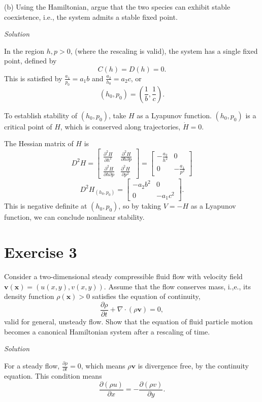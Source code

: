 \documentclass[a4paper,11pt,pdftex]{article}
\begin{document}
(b) Using the Hamiltonian, argue that the two species can exhibit stable coexistence, i.e., the system admits a stable fixed point. 

\emph{Solution}

In the region $h,p>0$, (where the rescaling is valid), the system has a single fixed point, defined by 
$$
C(h) = D(h) = 0. 
$$
This is satisfied by $\frac{a_1}{p_0} = a_1b$ and $\frac{a_2}{h_0} = a_2c$, or 
$$
(h_0, p_0) = \left(\frac{1}{b}, \frac{1}{c} \right).
$$

To establish stability of $(h_0, p_0)$, take $H$ as a Lyapunov function. $(h_0, p_0)$ is a critical point of $H$, which is conserved along trajectories, $\dot{H}=0$. 

The Hessian matrix of $H$ is
$$
D^2H = \begin{bmatrix}\frac{\partial^2 H}{\partial h^2} &  \frac{\partial^2 H}{\partial h\partial p} \\
\frac{\partial^2 H}{\partial h\partial p} & \frac{\partial^2 H}{\partial p^2}\end{bmatrix} = \begin{bmatrix} -\frac{a_2}{h^2} & 0 \\ 0 & -\frac{a_1}{p^2} \end{bmatrix} 
$$
$$
D^2 H_{(h_0,p_0)} = \begin{bmatrix}-a_2b^2 & 0 \\ 0 & -a_1c^2\end{bmatrix}.
$$
This is negative definite at $(h_0, p_0)$, so by taking $V=-H$ as a Lyapunov function, we can conclude nonlinear stability. 


\section*{Exercise 3}
Consider a two-dimensional steady compressible fluid flow with velocity field $\mathbf{v}(\mathbf{x})=(u(x,y), v(x,y))$. Assume that the flow conserves mass, i.,e., its density function $\rho(\mathbf{x})>0$ satisfies the equation of continuity,
$$
\frac{\partial \rho}{\partial t}+ \nabla \cdot (\rho \mathbf{v}) = 0,
$$
valid for general, unsteady flow. Show that the equation of fluid particle motion becomes a canonical Hamiltonian system after a rescaling of time. 

\emph{Solution}

For a steady flow, $\frac{\partial \rho}{\partial t} = 0$, which means $\rho \mathbf{v}$ is divergence free, by the continuity equation. This condition means
$$
\frac{\partial(\rho u)}{\partial x} = -\frac{\partial (\rho v)}{\partial y}.
$$
\end{document}
